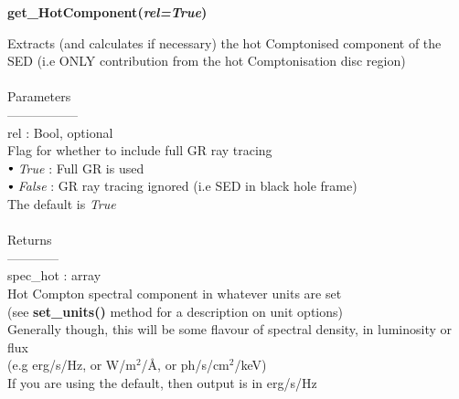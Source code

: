 \documentclass[a4paper, 11pt, times, onecolumn]{article}
\newcommand{\sbt}{\,\begin{picture}(-1,1)(-1,-3)\circle*{3}\end{picture}\ }
\begin{document}
\noindent
{\bf get\_HotComponent(\textit{rel=True})}
\begin{adjustwidth}{1.5cm}{}

	\noindent
	Extracts (and calculates if necessary) the hot Comptonised component of the SED (i.e ONLY contribution from the hot Comptonisation disc region)
	\\~\\
	Parameters\\
	-----------------\\
	\indent rel : Bool, optional \\
	\indent \indent Flag for whether to include full GR ray tracing \\
	\indent \indent \indent $\sbt$ {\it True} : Full GR is used \\
	\indent \indent \indent $\sbt$ {\it False} : GR ray tracing ignored (i.e SED in black hole frame) \\
	\indent \indent The default is {\it True}
	\\~\\
	Returns \\
	------------\\ 
	\indent spec\_hot : array \\
	\indent \indent Hot Compton spectral component in whatever units are set \\
	\indent \indent (see {\bf set\_units()} method for a description on unit options) \\
	\indent \indent Generally though, this will be some flavour of spectral density, in luminosity or flux \\
	\indent \indent  (e.g erg/s/Hz, or W/m$^{2}$/\AA,  or ph/s/cm$^{2}$/keV) \\
	\indent \indent If you are using the default, then output is in erg/s/Hz

\end{adjustwidth}

\vspace{1cm}
\end{document}
